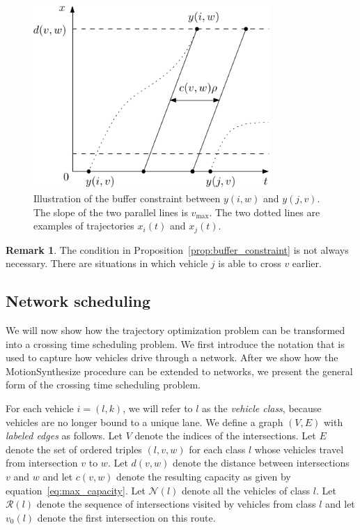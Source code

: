\documentclass{article}
\theoremstyle{definition}
\newtheorem{remark}{Remark}
\theoremstyle{plain}
\begin{document}
\begin{figure}[h]
  \centering
  \includegraphics[width=0.8\textwidth]{figures/capacity_constraint.pdf}
  \caption{Illustration of the buffer constraint between $y(i, w)$ and
    $y(j, v)$. The slope of the two parallel lines is $v_{\max}$. The two dotted
    lines are examples of trajectories $x_{i}(t)$ and $x_{j}(t)$.}\label{fig:constraint}
\end{figure}

\begin{remark}
  The condition in Proposition~\ref{prop:buffer_constraint} is not always necessary. There are situations
  in which vehicle $j$ is able to cross $v$ earlier.
\end{remark}


\subsection*{Network scheduling}

We will now show how the trajectory optimization problem can be transformed into
a crossing time scheduling problem. We first introduce the notation that is used
to capture how vehicles drive through a network. After we show how the
MotionSynthesize procedure can be extended to networks, we present the general
form of the crossing time scheduling problem.

For each vehicle $i = (l,k)$, we will refer to $l$ as the \textit{vehicle
  class}, because vehicles are no longer bound to a unique lane.
%
We define a graph $(V,E)$ with \textit{labeled edges} as follows. Let $V$ denote
the indices of the intersections. Let $E$ denote the set of ordered triples
$(l, v, w)$ for each class $l$ whose vehicles travel from intersection $v$ to
$w$.
%
Let $d(v, w)$ denote the distance between intersections $v$ and $w$ and let
$c(v, w)$ denote the resulting capacity as given by
equation~\eqref{eq:max_capacity}. Let $\mathcal{N}(l)$ denote all the vehicles
of class $l$. Let $\mathcal{R}(l)$ denote the sequence of intersections visited
by vehicles from class $l$ and let $v_{0}(l)$ denote the first intersection on
this route.
\end{document}
